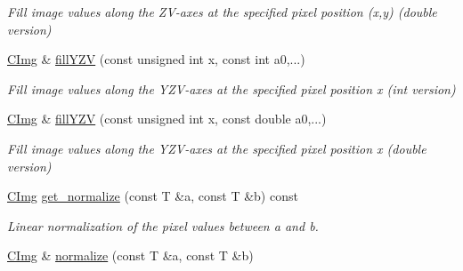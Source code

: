 \begin{DoxyCompactItemize}
\begin{DoxyCompactList}\small\item\em Fill image values along the Z\-V-\/axes at the specified pixel position (x,y) (double version) \end{DoxyCompactList}\item 
\hypertarget{structcimg__library_1_1_c_img_ae9628594b813491e2c1d4df9bab54f43}{\hyperlink{structcimg__library_1_1_c_img}{C\-Img} \& \hyperlink{structcimg__library_1_1_c_img_ae9628594b813491e2c1d4df9bab54f43}{fill\-Y\-Z\-V} (const unsigned int x, const int a0,...)}\label{structcimg__library_1_1_c_img_ae9628594b813491e2c1d4df9bab54f43}

\begin{DoxyCompactList}\small\item\em Fill image values along the Y\-Z\-V-\/axes at the specified pixel position x (int version) \end{DoxyCompactList}\item 
\hypertarget{structcimg__library_1_1_c_img_a14ea382be110dd1be41143d46ca803e0}{\hyperlink{structcimg__library_1_1_c_img}{C\-Img} \& \hyperlink{structcimg__library_1_1_c_img_a14ea382be110dd1be41143d46ca803e0}{fill\-Y\-Z\-V} (const unsigned int x, const double a0,...)}\label{structcimg__library_1_1_c_img_a14ea382be110dd1be41143d46ca803e0}

\begin{DoxyCompactList}\small\item\em Fill image values along the Y\-Z\-V-\/axes at the specified pixel position x (double version) \end{DoxyCompactList}\item 
\hyperlink{structcimg__library_1_1_c_img}{C\-Img} \hyperlink{structcimg__library_1_1_c_img_aaef1a4b9d0b090abb638f1c5ed128b06}{get\-\_\-normalize} (const T \&a, const T \&b) const 
\begin{DoxyCompactList}\small\item\em Linear normalization of the pixel values between {\itshape a} and {\itshape b}. \end{DoxyCompactList}\item 
\hypertarget{structcimg__library_1_1_c_img_aebe5488b504aa1e9f331d63efa6d578b}{\hyperlink{structcimg__library_1_1_c_img}{C\-Img} \& \hyperlink{structcimg__library_1_1_c_img_aebe5488b504aa1e9f331d63efa6d578b}{normalize} (const T \&a, const T \&b)}\label{structcimg__library_1_1_c_img_aebe5488b504aa1e9f331d63efa6d578b}


\end{DoxyCompactItemize}
